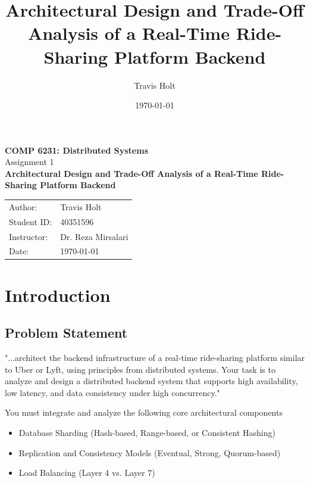 \documentclass[12pt]{article}
\title{Architectural Design and Trade-Off Analysis of a Real-Time Ride-Sharing Platform Backend}
\author{Travis Holt}
\date{\today}
\newcommand{\courseName}{COMP 6231: Distributed Systems}
\newcommand{\assignmentName}{Assignment 1}
\newcommand{\instructorName}{Dr. Reza Mirsalari}
\newcommand{\studentId}{40351596}
\begin{document}
\begin{titlepage}
    \centering
    \vspace*{2cm}
    {\LARGE \textbf{\courseName}}\\[0.5cm]
    {\Large \assignmentName}\\[1.5cm]
    {\Huge \textbf{Architectural Design and Trade-Off Analysis of a Real-Time Ride-Sharing Platform Backend}}\\[2cm]

    \vfill

    {\large
    \begin{tabular}{ll}
        Author: & Travis Holt \\
        Student ID: & \studentId \\
        Instructor: & \instructorName \\
        Date: & \today \\
    \end{tabular}
    }

    \vspace*{1cm}
\end{titlepage}


\section{Introduction}
\label{sec:introduction}

\subsection{Problem Statement}
"...architect the backend infrastructure of a real-time ride-sharing platform similar to Uber or Lyft, using principles
from distributed systems. Your task is to analyze and design a distributed backend
system that supports high availability, low latency, and data consistency under high
concurrency."

You must integrate and analyze the following core architectural components
\begin{itemize}
    \item Database Sharding (Hash-based, Range-based, or Consistent Hashing)
    \item Replication and Consistency Models (Eventual, Strong, Quorum-based)
    \item Load Balancing (Layer 4 vs. Layer 7)
\end{itemize}
\end{document}
